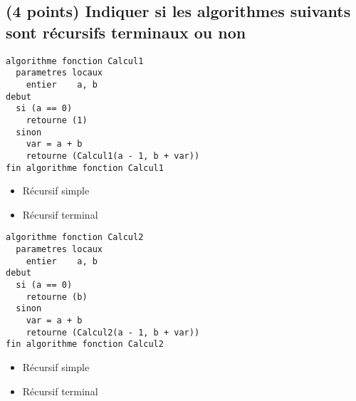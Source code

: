 \documentclass[11pt,a4paper]{article}
\begin{document}
\MakeExamTitle                   %




\renewcommand{\thesubsection}{\arabic{subsection}} %




\subsection{(4 points) Indiquer si les algorithmes suivants sont récursifs terminaux ou non }

\begin{table}[htb!]
  \centering
  \begin{minipage}{0.50\textwidth}
    \centering
  \begin{lstlisting}[style=algorithmique]
algorithme fonction Calcul1
  parametres locaux
    entier    a, b
debut
  si (a == 0)
    retourne (1)
  sinon
    var = a + b
    retourne (Calcul1(a - 1, b + var))
fin algorithme fonction Calcul1
  \end{lstlisting}

  \begin{itemize}
    \item[\CaseCoche] Récursif simple \\
    \item[\CaseCoche] Récursif terminal \\
  \end{itemize}

  \end{minipage}
  \hfillx
  \begin{minipage}{0.5\textwidth}
    \centering
  \begin{lstlisting}[style=algorithmique]
algorithme fonction Calcul2
  parametres locaux
    entier    a, b
debut
  si (a == 0)
    retourne (b)
  sinon
    var = a + b
    retourne (Calcul2(a - 1, b + var))
fin algorithme fonction Calcul2
  \end{lstlisting}

  \begin{itemize}
    \item[\CaseCoche] Récursif simple \\
    \item[\CaseCoche] Récursif terminal \\
  \end{itemize}

  \end{minipage}
\end{table}
\end{document}
